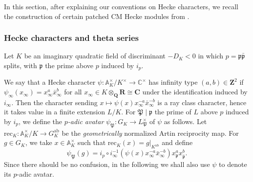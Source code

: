 \documentclass[10pt,letterpaper]{amsart}
\theoremstyle{plain}
\theoremstyle{definition}
\theoremstyle{definition}
\theoremstyle{plain}
\theoremstyle{plain}
\theoremstyle{plain}
\theoremstyle{remark}
\numberwithin{equation}{section}
\newcommand{\pp}{\mathfrak{p}}
\newcommand{\ppbar}{\bar{\mathfrak{p}}}
\DeclareMathOperator{\pa}{\mathfrak{p}}
\DeclareMathOperator{\p}{\mathfrak{P}}
\newcommand{\Q}{\mathbf{Q}}
\newcommand{\Z}{\mathbf{Z}}
\begin{document}
In this section, after explaining our conventions on Hecke characters, we recall the construction of certain patched CM Hecke modules from \cite[\S{5.2}]{LLZ-K}.

\subsubsection{Hecke characters and theta series }\label{theta}

Let $K$ be an imaginary quadratic field of discriminant $-D_K<0$  in which $p=\pp\ppbar$ splits, with $\pp$ the prime  above $p$ induced by $i_p$. 

We say that a Hecke character $\psi:\mathbb{A}_K^{\times}/K^{\times}\rightarrow \mathbb{C}^{\times}$ has infinity type $(a,b)\in\Z^2$ if $\psi_{\infty}(x_{\infty})=x_{\infty}^a\bar{x}_{\infty}^b$ for all $x_\infty\in K\otimes_{\Q}\mathbf{R}\cong\mathbf{C}$  under the identification induced by $i_\infty$. 
Then the character sending $x\mapsto\psi(x)x_{\infty}^{-a}\bar{x}_{\infty}^{-b}$ is a ray class character, hence it takes value in a finite extension $L/K$. For $\mathfrak{P}\mid\pp$ the prime of $L$ above $p$ induced by $i_p$, we define the \emph{$p$-adic avatar} $\psi_\mathfrak{P}:G_K\rightarrow L_\mathfrak{P}^\times$ of $\psi$ as follows. Let  $\text{rec}_K:\mathbb{A}_K^{\times}/K\rightarrow G_K^{\text{ab}}$ be the \emph{geometrically} normalized Artin reciprocity map. For $g\in G_K$, 
we take $x\in\mathbb{A}_K^{\times}$ such that $\text{rec}_K(x)=g\vert_{K^{\mathrm{ab}}}$ and define
\begin{equation}
        \psi_{\p}(g)=i_p\circ i_{\infty}^{-1}(\psi(x)x_{\infty}^{-a}\bar{x}_{\infty}^{-b})x_{\pa}^a x_{\bar{\pa}}^b.\nonumber
\end{equation}
Since there should be no confusion, in the following we shall also use $\psi$ to denote its $p$-adic avatar.
\end{document}
